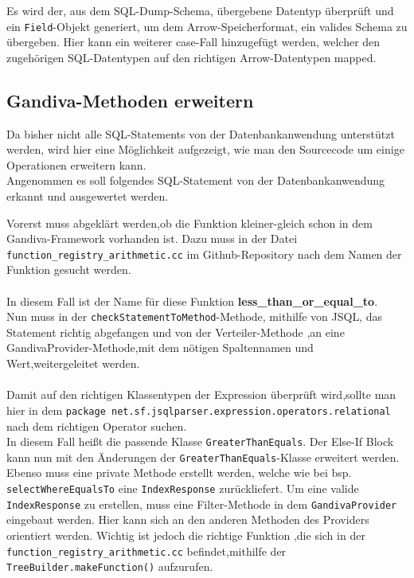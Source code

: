 Es wird der, aus dem SQL-Dump-Schema, übergebene Datentyp überprüft und ein \texttt{Field}-Objekt generiert, um dem Arrow-Speicherformat, ein valides Schema zu übergeben.
Hier kann ein weiterer case-Fall hinzugefügt werden, welcher den zugehörigen SQL-Datentypen auf den richtigen Arrow-Datentypen mapped.

\subsection{Gandiva-Methoden erweitern}

Da bisher nicht alle SQL-Statements von der Datenbankanwendung unterstützt werden, wird hier eine Möglichkeit aufgezeigt, wie man den Sourcecode um einige Operationen erweitern kann.\\
Angenommen es soll folgendes SQL-Statement von der Datenbankanwendung erkannt und ausgewertet werden.

\begin{center}
\end{center}

Vorerst muss abgeklärt werden,ob die Funktion \glqq{}kleiner-gleich\grqq{} schon in dem Gandiva-Framework vorhanden ist. Dazu muss in der Datei \texttt{function\_registry\_arithmetic.cc} im Github-Repository  nach dem Namen der Funktion gesucht werden.\\\\

In diesem Fall ist der Name für diese Funktion \textbf{less\_than\_or\_equal\_to}.\\
Nun muss in der \texttt{checkStatementToMethod}-Methode, mithilfe von JSQL, das Statement richtig abgefangen und von der Verteiler-Methode ,an eine GandivaProvider-Methode,mit dem nötigen Spaltennamen und Wert,weitergeleitet werden.\\\\

Damit auf den richtigen Klassentypen der Expression überprüft wird,sollte man hier in dem \texttt{package net.sf.jsqlparser.expression.operators.relational} nach dem richtigen Operator suchen.\\
In diesem Fall heißt die passende Klasse \texttt{GreaterThanEquals}. Der Else-If Block kann nun mit den Änderungen der \texttt{GreaterThanEquals}-Klasse erweitert werden. Ebenso muss eine private Methode erstellt werden, welche wie bei bsp. \texttt{selectWhereEqualsTo} eine \texttt{IndexResponse} zurückliefert.
Um eine valide \texttt{IndexResponse} zu erstellen, muss eine Filter-Methode in dem \texttt{GandivaProvider} eingebaut werden.
Hier kann sich an den anderen Methoden des Providers orientiert werden. Wichtig ist jedoch die richtige Funktion ,die sich in der \texttt{function\_registry\_arithmetic.cc} befindet,mithilfe der \texttt{TreeBuilder.makeFunction()} aufzurufen.


